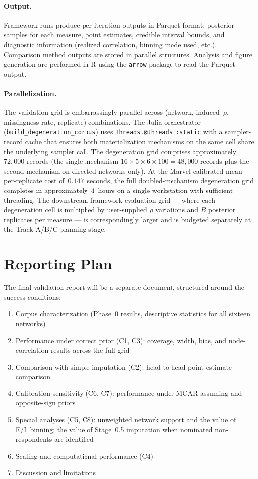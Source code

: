 \documentclass[11pt]{article}
\begin{document}
\paragraph{Output.} Framework runs produce per-iteration outputs in Parquet format: posterior samples for each measure, point estimates, credible interval bounds, and diagnostic information (realized correlation, binning mode used, etc.). Comparison method outputs are stored in parallel structures. Analysis and figure generation are performed in R using the \texttt{arrow} package to read the Parquet output.

\paragraph{Parallelization.} The validation grid is embarrassingly parallel across (network, induced~$\rho$, missingness rate, replicate) combinations. The Julia orchestrator (\texttt{build\_degeneration\_corpus}) uses \texttt{Threads.@threads :static} with a sampler-record cache that ensures both materialization mechanisms on the same cell share the underlying sampler call. The degeneration grid comprises approximately~$72{,}000$ records (the single-mechanism $16 \times 5 \times 6 \times 100 = 48{,}000$ records plus the second mechanism on directed networks only). At the Marvel-calibrated mean per-replicate cost of~$0.147$~seconds, the full doubled-mechanism degeneration grid completes in approximately~$4$~hours on a single workstation with sufficient threading. The downstream framework-evaluation grid --- where each degeneration cell is multiplied by user-supplied $\rho$ variations and $B$ posterior replicates per measure --- is correspondingly larger and is budgeted separately at the Track-A/B/C planning stage.

\section{Reporting Plan}

The final validation report will be a separate document, structured around the success conditions:

\begin{enumerate}[leftmargin=*, itemsep=2pt]
  \item Corpus characterization (Phase~0 results, descriptive statistics for all sixteen networks)
  \item Performance under correct prior (C1, C3): coverage, width, bias, and node-correlation results across the full grid
  \item Comparison with simple imputation (C2): head-to-head point-estimate comparison
  \item Calibration sensitivity (C6, C7): performance under MCAR-assuming and opposite-sign priors
  \item Special analyses (C5, C8): unweighted network support and the value of E/I~binning; the value of Stage~0.5 imputation when nominated non-respondents are identified
  \item Scaling and computational performance (C4)
  \item Discussion and limitations
\end{enumerate}
\end{document}
